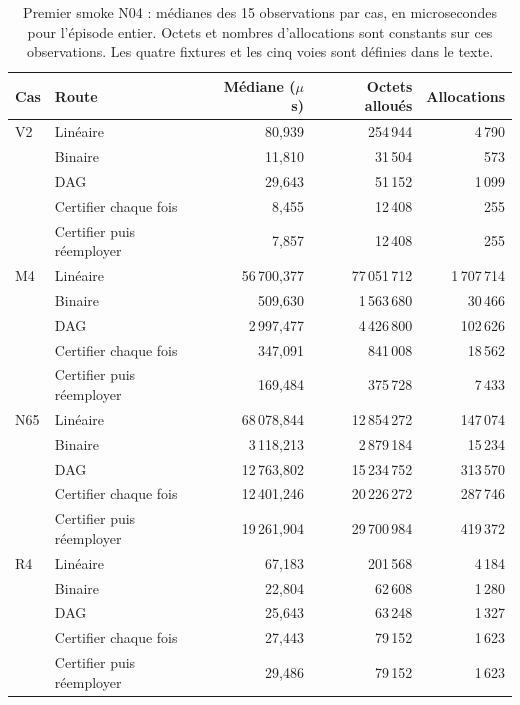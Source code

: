 \documentclass[11pt,a4paper]{article}
\begin{document}
\begin{table}[ht]
\centering\small
\begin{tabular}{@{}llrrr@{}}
\toprule
Cas & Route & Médiane (\(\mu\)s) & Octets alloués & Allocations \\
\midrule
V2 & Linéaire & 80,939 & 254\,944 & 4\,790 \\
 & Binaire & 11,810 & 31\,504 & 573 \\
 & DAG & 29,643 & 51\,152 & 1\,099 \\
 & Certifier chaque fois & 8,455 & 12\,408 & 255 \\
 & Certifier puis réemployer & 7,857 & 12\,408 & 255 \\
\addlinespace
M4 & Linéaire & 56\,700,377 & 77\,051\,712 & 1\,707\,714 \\
 & Binaire & 509,630 & 1\,563\,680 & 30\,466 \\
 & DAG & 2\,997,477 & 4\,426\,800 & 102\,626 \\
 & Certifier chaque fois & 347,091 & 841\,008 & 18\,562 \\
 & Certifier puis réemployer & 169,484 & 375\,728 & 7\,433 \\
\addlinespace
N65 & Linéaire & 68\,078,844 & 12\,854\,272 & 147\,074 \\
 & Binaire & 3\,118,213 & 2\,879\,184 & 15\,234 \\
 & DAG & 12\,763,802 & 15\,234\,752 & 313\,570 \\
 & Certifier chaque fois & 12\,401,246 & 20\,226\,272 & 287\,746 \\
 & Certifier puis réemployer & 19\,261,904 & 29\,700\,984 & 419\,372 \\
\addlinespace
R4 & Linéaire & 67,183 & 201\,568 & 4\,184 \\
 & Binaire & 22,804 & 62\,608 & 1\,280 \\
 & DAG & 25,643 & 63\,248 & 1\,327 \\
 & Certifier chaque fois & 27,443 & 79\,152 & 1\,623 \\
 & Certifier puis réemployer & 29,486 & 79\,152 & 1\,623 \\
\bottomrule
\end{tabular}
\caption{Premier smoke N04 : médianes des 15 observations par cas,
en microsecondes pour l'épisode entier. Octets et nombres d'allocations
sont constants sur ces observations. Les quatre fixtures et les cinq
voies sont définies dans le texte.}
\label{tab:n04smoke}
\end{table}
\end{document}
